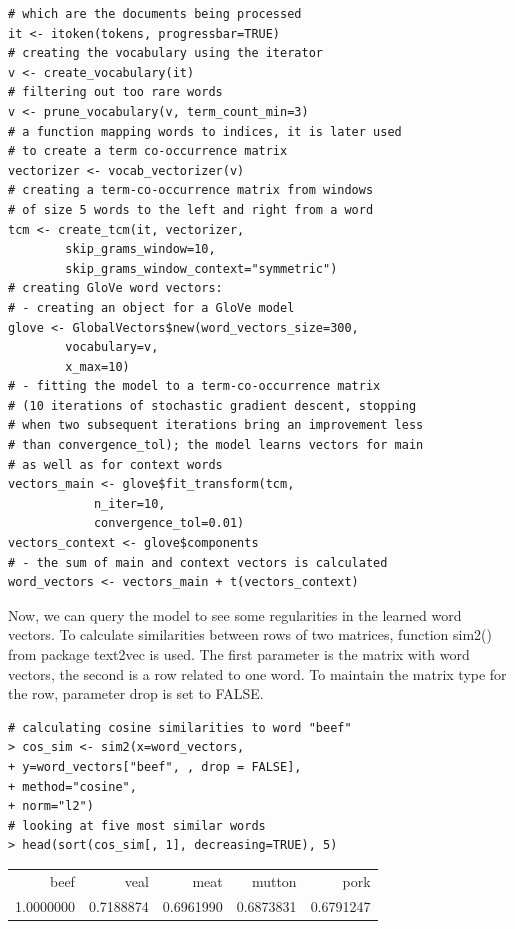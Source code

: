 \begin{verbatim}
# which are the documents being processed
it <- itoken(tokens, progressbar=TRUE)
# creating the vocabulary using the iterator
v <- create_vocabulary(it)
# filtering out too rare words
v <- prune_vocabulary(v, term_count_min=3)
# a function mapping words to indices, it is later used
# to create a term co-occurrence matrix
vectorizer <- vocab_vectorizer(v)
# creating a term-co-occurrence matrix from windows
# of size 5 words to the left and right from a word
tcm <- create_tcm(it, vectorizer,
        skip_grams_window=10,
        skip_grams_window_context="symmetric")
# creating GloVe word vectors:
# - creating an object for a GloVe model
glove <- GlobalVectors$new(word_vectors_size=300,
        vocabulary=v,
        x_max=10)
# - fitting the model to a term-co-occurrence matrix
# (10 iterations of stochastic gradient descent, stopping
# when two subsequent iterations bring an improvement less
# than convergence_tol); the model learns vectors for main
# as well as for context words
vectors_main <- glove$fit_transform(tcm,
            n_iter=10,
            convergence_tol=0.01)
vectors_context <- glove$components
# - the sum of main and context vectors is calculated
word_vectors <- vectors_main + t(vectors_context)
\end{verbatim}

Now, we can query the model to see some regularities in the learned word vectors. To calculate similarities between rows of two matrices, function sim2() from package text2vec is used. The first parameter is the matrix with word vectors, the second is a row related to one word. To maintain the matrix type for the row, parameter drop is set to FALSE.

\begin{verbatim}
# calculating cosine similarities to word "beef"
> cos_sim <- sim2(x=word_vectors,
+ y=word_vectors["beef", , drop = FALSE],
+ method="cosine",
+ norm="l2")
# looking at five most similar words
> head(sort(cos_sim[, 1], decreasing=TRUE), 5)
\end{verbatim}

\begin{center}
\begin{tabular}{rrrrr}
beef & veal & meat & mutton & pork \\
1.0000000 & 0.7188874 & 0.6961990 & 0.6873831 & 0.6791247 \\
\end{tabular}
\end{center}

